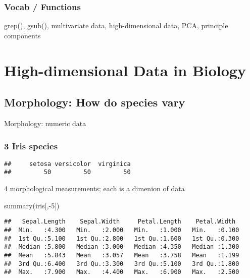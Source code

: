 \documentclass[
]{book}
\newenvironment{Shaded}{\begin{snugshade}}{\end{snugshade}}
\newcommand{\DecValTok}[1]{\textcolor[rgb]{0.00,0.00,0.81}{#1}}
\newcommand{\FunctionTok}[1]{\textcolor[rgb]{0.00,0.00,0.00}{#1}}
\newcommand{\NormalTok}[1]{#1}
\newcommand{\SpecialCharTok}[1]{\textcolor[rgb]{0.00,0.00,0.00}{#1}}
\begin{document}
\hypertarget{vocab-functions}{%
\subsubsection{Vocab / Functions}\label{vocab-functions}}

grep(), gsub(), multivariate data, high-dimensional data, PCA, principle components

\hypertarget{high-dimensional-data-in-biology}{%
\section{High-dimensional Data in Biology}\label{high-dimensional-data-in-biology}}

\hypertarget{morphology-how-do-species-vary}{%
\subsection{Morphology: How do species vary}\label{morphology-how-do-species-vary}}

Morphology: numeric data

\hypertarget{iris-species}{%
\subsubsection{3 Iris species}\label{iris-species}}

\begin{Shaded}
\end{Shaded}

\begin{verbatim}
##     setosa versicolor  virginica 
##         50         50         50
\end{verbatim}

4 morphological measurements; each is a dimenion of data

\begin{Shaded}
\begin{Highlighting}[]
\FunctionTok{summary}\NormalTok{(iris[,}\SpecialCharTok{{-}}\DecValTok{5}\NormalTok{])}
\end{Highlighting}
\end{Shaded}

\begin{verbatim}
##   Sepal.Length    Sepal.Width     Petal.Length    Petal.Width   
##  Min.   :4.300   Min.   :2.000   Min.   :1.000   Min.   :0.100  
##  1st Qu.:5.100   1st Qu.:2.800   1st Qu.:1.600   1st Qu.:0.300  
##  Median :5.800   Median :3.000   Median :4.350   Median :1.300  
##  Mean   :5.843   Mean   :3.057   Mean   :3.758   Mean   :1.199  
##  3rd Qu.:6.400   3rd Qu.:3.300   3rd Qu.:5.100   3rd Qu.:1.800  
##  Max.   :7.900   Max.   :4.400   Max.   :6.900   Max.   :2.500
\end{verbatim}
\end{document}
